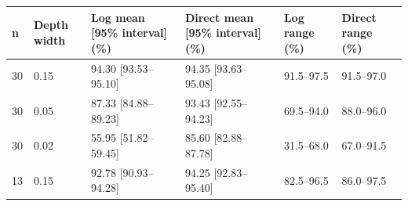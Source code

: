 \begin{tabular}{llllll}
\hline
n & Depth width & Log mean [95\% interval] (\%) & Direct mean [95\% interval] (\%) & Log range (\%) & Direct range (\%) \\
\hline
30 & 0.15 & 94.30 [93.53–95.10] & 94.35 [93.63–95.08] & 91.5–97.5 & 91.5–97.0 \\
30 & 0.05 & 87.33 [84.88–89.23] & 93.43 [92.55–94.23] & 69.5–94.0 & 88.0–96.0 \\
30 & 0.02 & 55.95 [51.82–59.45] & 85.60 [82.88–87.78] & 31.5–68.0 & 67.0–91.5 \\
13 & 0.15 & 92.78 [90.93–94.28] & 94.25 [92.83–95.40] & 82.5–96.5 & 86.0–97.5 \\
\hline
\end{tabular}
